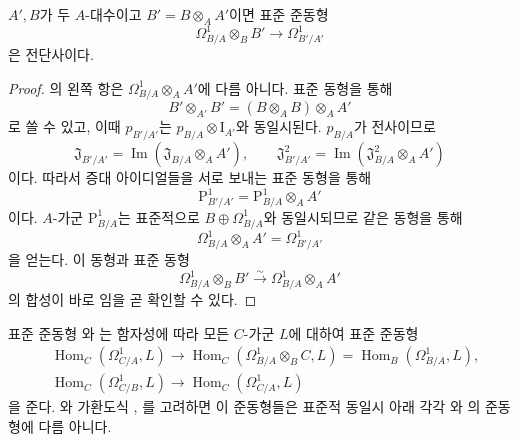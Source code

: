\begin{proposition}[20.5.5]
\label{0.20.5.5-ko}
$A',B$가 두 $A$-대수이고 $B'=B\otimes_A A'$이면 표준 준동형
\begin{equation}
\tag{20.5.5.1}
\label{0.20.5.5.1-ko}
  \Omega^1_{B/A}\otimes_B B'\to\Omega^1_{B'/A'}
\end{equation}
은 전단사이다.
\end{proposition}

\begin{proof}
의 왼쪽 항은
$\Omega^1_{B/A}\otimes_A A'$에 다름 아니다. 표준 동형을 통해
\[
  B'\otimes_{A'}B'=(B\otimes_A B)\otimes_A A'
\]
로 쓸 수 있고, 이때 $p_{B'/A'}$는
$p_{B/A}\otimes\mathrm I_{A'}$와 동일시된다. $p_{B/A}$가
전사이므로
\[
  \mathfrak J_{B'/A'}
  =\operatorname{Im}(\mathfrak J_{B/A}\otimes_A A'),
  \qquad
  \mathfrak J^2_{B'/A'}
  =\operatorname{Im}(\mathfrak J^2_{B/A}\otimes_A A')
\]
이다. 따라서 증대 아이디얼들을 서로 보내는 표준 동형을 통해
\[
  \mathrm P^1_{B'/A'}
  =\mathrm P^1_{B/A}\otimes_A A'
\]
이다. $A$-가군 $\mathrm P^1_{B/A}$는 표준적으로
$B\oplus\Omega^1_{B/A}$와 동일시되므로 같은 동형을 통해
\begin{equation}
\tag{20.5.5.2}
\label{0.20.5.5.2-ko}
  \Omega^1_{B/A}\otimes_A A'=\Omega^1_{B'/A'}
\end{equation}
을 얻는다. 이 동형과 표준 동형
\[
  \Omega^1_{B/A}\otimes_B B'
  \xrightarrow{\sim}\Omega^1_{B/A}\otimes_A A'
\]
의 합성이 바로 임을 곧 확인할 수 있다.
\end{proof}

\begin{env}[20.5.6]
\label{0.20.5.6-ko}
표준 준동형 와
는 함자성에 따라 모든 $C$-가군 $L$에 대하여
표준 준동형
\begin{align}
\tag{20.5.6.1}
\label{0.20.5.6.1-ko}
  &\operatorname{Hom}_C(\Omega^1_{C/A},L)
  \to\operatorname{Hom}_C(\Omega^1_{B/A}\otimes_B C,L)
  =\operatorname{Hom}_B(\Omega^1_{B/A},L),\\
\tag{20.5.6.2}
\label{0.20.5.6.2-ko}
  &\operatorname{Hom}_C(\Omega^1_{C/B},L)
  \to\operatorname{Hom}_C(\Omega^1_{C/A},L)
\end{align}
을 준다. 와 가환도식
, 를 고려하면 이
준동형들은 표준적 동일시 아래 각각
와 의 준동형에 다름
아니다.
\end{env}

